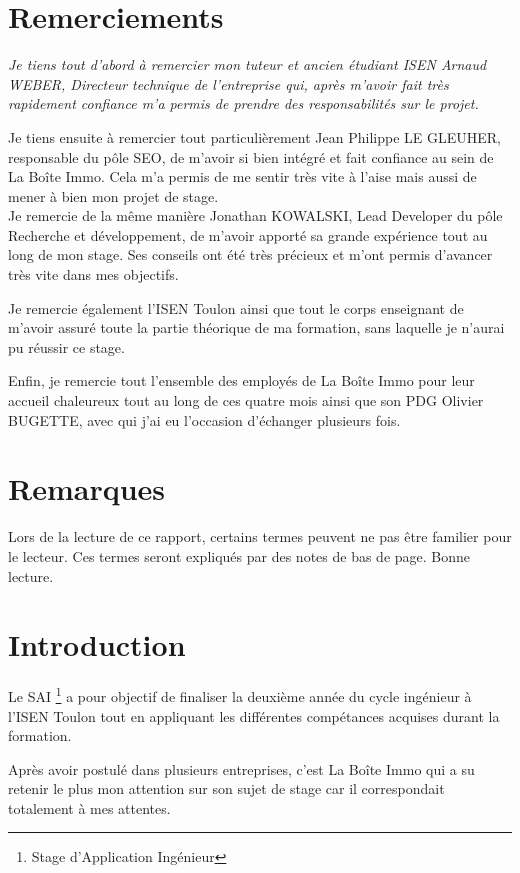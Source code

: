 \documentclass[12pt]{article}
\begin{document}
\section{Remerciements}
{\it
Je tiens tout d'abord à remercier mon tuteur et ancien étudiant ISEN Arnaud WEBER, Directeur technique de l'entreprise qui, après m'avoir fait très rapidement confiance m'a permis de prendre des responsabilités sur le projet.

Je tiens ensuite à remercier tout particulièrement Jean Philippe LE GLEUHER, responsable du pôle SEO, de m'avoir si bien intégré et fait confiance au sein de La Boîte Immo. Cela m'a permis de me sentir très vite à l'aise mais aussi de mener à bien mon projet de stage.\\
Je remercie de la même manière Jonathan KOWALSKI, Lead Developer du pôle Recherche et développement, de m'avoir apporté sa grande expérience tout au long de mon stage. Ses conseils ont été très précieux et m'ont permis d'avancer très vite dans mes objectifs.

Je remercie également l'ISEN Toulon ainsi que tout le corps enseignant de m'avoir assuré toute la partie théorique de ma formation, sans laquelle je n'aurai pu réussir ce stage.

Enfin, je remercie tout l'ensemble des employés de La Boîte Immo pour leur accueil chaleureux tout au long de ces quatre mois ainsi que son PDG Olivier BUGETTE, avec qui j'ai eu l'occasion d'échanger plusieurs fois.}

\newpage

\section{Remarques}
Lors de la lecture de ce rapport, certains termes peuvent ne pas être familier pour le lecteur. Ces termes seront expliqués par des notes de bas de page.\newline
Bonne lecture.
\newpage

\section{Introduction}
Le SAI \footnote{Stage d'Application Ingénieur} a pour objectif de finaliser la deuxième année du cycle ingénieur à l'ISEN Toulon tout en appliquant les différentes compétances acquises durant la formation.

Après avoir postulé dans plusieurs entreprises, c'est La Boîte Immo qui a su retenir le plus mon attention sur son sujet de stage car il correspondait totalement à mes attentes. 
\end{document}
